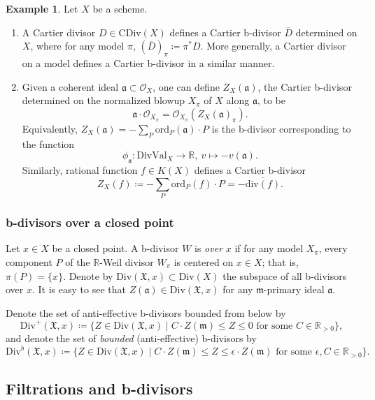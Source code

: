 \documentclass[11pt, leqno]{amsart}%
\theoremstyle{plain}
\theoremstyle{definition}
\newtheorem{example}[theorem]{Example}
\theoremstyle{remark}
\newcommand{\cO}{\mathcal{O}}
\newcommand{\bR}{\mathbb{R}}
\newcommand{\fX}{\mathfrak{X}}
\newcommand{\fa}{\mathfrak{a}}
\newcommand{\fm}{\mathfrak{m}}
\newcommand{\ord}{\mathrm{ord}}
\newcommand{\DivVal}{\mathrm{DivVal}}
\newcommand{\Div}{\mathrm{Div}}
\newcommand{\CDiv}{\mathrm{CDiv}}
\begin{document}
\begin{example}\label{eg:b-div of an ideal}
    Let $X$ be a scheme.
    \begin{enumerate}
        \item A Cartier divisor $D\in\CDiv(X)$ defines a Cartier b-divisor $\overline D$ determined on $X$, where for any model $\pi$, $(\overline D)_\pi\coloneqq \pi^*D$. 
        More generally, a Cartier divisor on a model defines a Cartier b-divisor in a similar manner. 

        \item Given a coherent ideal $\fa\subset \cO_X$, one can define $Z_X(\fa)$, the Cartier b-divisor determined on the normalized blowup $X_\pi$ of $X$ along $\fa$, to be
        \[
		      \fa\cdot\cO_{X_\pi}=\cO_{X_\pi}(Z_X(\fa)_\pi).
        \]
        Equivalently, $Z_X(\fa)=-\sum_P \ord_P(\fa)\cdot P$ is the b-divisor corresponding to the function 
        \[
            \phi_\fa:\DivVal_X\to \bR,~ v\mapsto -v(\fa).
        \]
        Similarly, rational function $f\in K(X)$ defines a Cartier b-divisor 
        \[
            Z_X(f)\coloneqq -\sum_P \ord_P(f)\cdot P=-\overline{\mathrm{div}(f)}.
        \] 
    \end{enumerate}
\end{example}



\subsubsection{b-divisors over a closed point}

Let $x\in X$ be a closed point. A b-divisor $W$ is \emph{over} $x$ if for any model $X_\pi$, every component $P$ of the $\bR$-Weil divisor $W_\pi$ is centered on $x\in X$; that is, $\pi(P)=\{x\}$. 
Denote by $\Div(\fX,x)\subset \Div(X)$ the subspace of all b-divisors over $x$. It is easy to see that $Z(\fa)\in\Div(\fX,x)$ for any $\fm$-primary ideal $\fa$.  

Denote the set of anti-effective b-divisors bounded from below by 
\[
    \Div^+(\fX,x)\coloneqq \{Z\in\Div(\fX,x)\mid C\cdot Z(\fm)\le Z\le 0 \text{ for some } C\in\bR_{>0}\},
\]
and denote the set of \emph{bounded} (anti-effective) b-divisors by
\[
    \Div^b(\fX,x)\coloneqq \{Z\in\Div(\fX,x)\mid C\cdot Z(\fm)\le Z\le \epsilon\cdot Z(\fm) \text{ for some } \epsilon,C\in\bR_{>0}\}.
\]



\subsection{Filtrations and b-divisors}\label{ssec:filtr and b-div}
\end{document}
